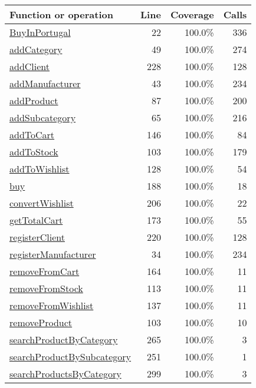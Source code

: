 \begin{longtable}{|l|r|r|r|}
\hline
Function or operation & Line & Coverage & Calls \\
\hline
\hline
\hyperref[BuyInPortugal:22]{BuyInPortugal} & 22&100.0\% & 336 \\
\hline
\hyperref[addCategory:49]{addCategory} & 49&100.0\% & 274 \\
\hline
\hyperref[addClient:228]{addClient} & 228&100.0\% & 128 \\
\hline
\hyperref[addManufacturer:43]{addManufacturer} & 43&100.0\% & 234 \\
\hline
\hyperref[addProduct:87]{addProduct} & 87&100.0\% & 200 \\
\hline
\hyperref[addSubcategory:65]{addSubcategory} & 65&100.0\% & 216 \\
\hline
\hyperref[addToCart:146]{addToCart} & 146&100.0\% & 84 \\
\hline
\hyperref[addToStock:103]{addToStock} & 103&100.0\% & 179 \\
\hline
\hyperref[addToWishlist:128]{addToWishlist} & 128&100.0\% & 54 \\
\hline
\hyperref[buy:188]{buy} & 188&100.0\% & 18 \\
\hline
\hyperref[convertWishlist:206]{convertWishlist} & 206&100.0\% & 22 \\
\hline
\hyperref[getTotalCart:173]{getTotalCart} & 173&100.0\% & 55 \\
\hline
\hyperref[registerClient:220]{registerClient} & 220&100.0\% & 128 \\
\hline
\hyperref[registerManufacturer:34]{registerManufacturer} & 34&100.0\% & 234 \\
\hline
\hyperref[removeFromCart:164]{removeFromCart} & 164&100.0\% & 11 \\
\hline
\hyperref[removeFromStock:113]{removeFromStock} & 113&100.0\% & 11 \\
\hline
\hyperref[removeFromWishlist:137]{removeFromWishlist} & 137&100.0\% & 11 \\
\hline
\hyperref[removeProduct:103]{removeProduct} & 103&100.0\% & 10 \\
\hline
\hyperref[searchProductByCategory:265]{searchProductByCategory} & 265&100.0\% & 3 \\
\hline
\hyperref[searchProductBySubcategory:251]{searchProductBySubcategory} & 251&100.0\% & 1 \\
\hline
\hyperref[searchProductsByCategory:299]{searchProductsByCategory} & 299&100.0\% & 3 \\
\hline

\end{longtable}
